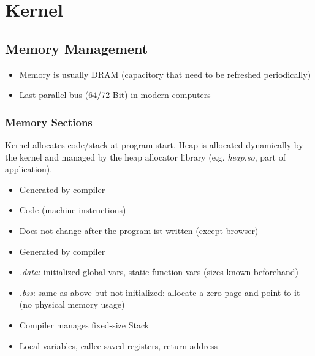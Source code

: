 \section{Kernel}
\subsection{Memory Management}
\begin{itemize}
    \item Memory is usually DRAM (capacitory that need to be refreshed periodically)
    \item Last parallel bus (64/72 Bit) in modern computers
\end{itemize}


\subsubsection{Memory Sections}
Kernel allocates code/stack at program start. Heap is allocated dynamically by the kernel and managed by the heap allocator library (e.g. \textit{heap.so}, part of application).


\begin{itemize}
    \item Generated by compiler
    \item Code (machine instructions)
    \item Does not change after the program ist written (except browser)
\end{itemize}



\begin{itemize}
    \item Generated by compiler
    \item \textit{.data}: initialized global vars, static function vars (sizes known beforehand)
    \item \textit{.bss}: same as above but not initialized: allocate a zero page and point to it (no physical memory usage)
\end{itemize}


\begin{itemize}
    \item Compiler manages fixed-size Stack
    \item Local variables, callee-saved registers, return address
\end{itemize}

